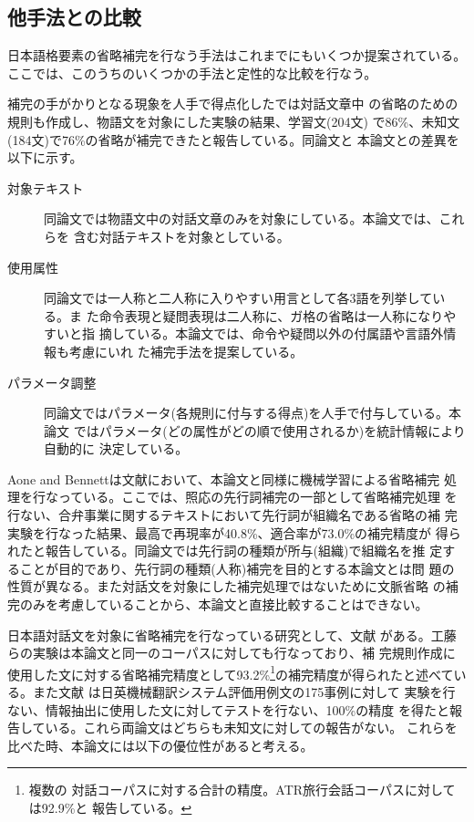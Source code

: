 \subsection{他手法との比較}
\label{節:比較}

日本語格要素の省略補完を行なう手法はこれまでにもいくつか提案されている。
ここでは、このうちのいくつかの手法と定性的な比較を行なう。

補完の手がかりとなる現象を人手で得点化した{}\cite{村田}では対話文章中
の省略のための規則も作成し、物語文を対象にした実験の結果、学習文(204文)
で86\%、未知文(184文)で76\%の省略が補完できたと報告している。同論文と
本論文との差異を以下に示す。

\begin{description}
\item[対象テキスト]
同論文では物語文中の対話文章のみを対象にしている。本論文では、これらを
含む対話テキストを対象としている。

\item[使用属性]
同論文では一人称と二人称に入りやすい用言として各3語を列挙している。ま
た命令表現と疑問表現は二人称に、ガ格の省略は一人称になりやすいと指
摘している。本論文では、命令や疑問以外の付属語や言語外情報も考慮にいれ
た補完手法を提案している。

\item[パラメータ調整]
同論文ではパラメータ(各規則に付与する得点)を人手で付与している。本論文
ではパラメータ(どの属性がどの順で使用されるか)を統計情報により自動的に
決定している。

\end{description}

Aone and Bennettは文献\cite{Aone}において、本論文と同様に機械学習による省略補完
処理を行なっている。ここでは、照応の先行詞補完の一部として省略補完処理
を行ない、合弁事業に関するテキストにおいて先行詞が組織名である省略の補
完実験を行なった結果、最高で再現率が40.8\%、適合率が73.0\%の補完精度が
得られたと報告している。同論文では先行詞の種類が所与(組織)で組織名を推
定することが目的であり、先行詞の種類(人称)補完を目的とする本論文とは問
題の性質が異なる。また対話文を対象にした補完処理ではないために文脈省略
の補完のみを考慮していることから、本論文と直接比較することはできない。

日本語対話文を対象に省略補完を行なっている研究として、文献\cite{工藤}
がある。工藤らの実験は本論文と同一のコーパスに対しても行なっており、補
完規則作成に使用した文に対する省略補完精度として93.2\%\footnote{複数の
対話コーパスに対する合計の精度。ATR旅行会話コーパスに対しては92.9\%と
報告している。}の補完精度が得られたと述べている。また文献
{}\cite{Nakaiwa}は日英機械翻訳システム評価用例文の175事例に対して
実験を行ない、情報抽出に使用した文に対してテストを行ない、100\%の精度
を得たと報告している。これら両論文はどちらも未知文に対しての報告がない。
これらを比べた時、本論文には以下の優位性があると考える。

